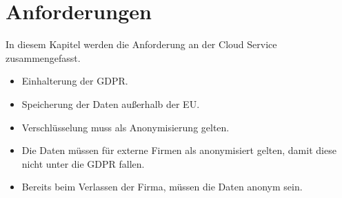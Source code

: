 \section{Anforderungen}
In diesem Kapitel werden die Anforderung an der Cloud Service zusammengefasst.

\begin{itemize}
\item Einhalterung der GDPR.
\item Speicherung der Daten außerhalb der EU.
\item Verschlüsselung muss als Anonymisierung gelten.
\item Die Daten müssen für externe Firmen als anonymisiert gelten, damit diese nicht unter die GDPR fallen. 
\item Bereits beim Verlassen der Firma, müssen die Daten anonym sein. 
\end{itemize}